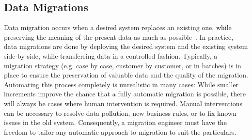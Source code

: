\documentclass[runningheads]{llncs}
\begin{document}
\subsection{Data Migrations}
   Data migration occurs when a desired system replaces an existing one,
   while preserving the meaning of the present data as much as possible~\cite{Spivak2012}.
   In practice, data migrations are done by deploying the desired system and the existing system side-by-side,
   while transferring data in a controlled fashion.
   Typically, a migration strategy (e.g. case by case, customer by customer, or in batches) is in place
   to ensure the preservation of valuable data and the quality of the migration.
   Automating this process completely is unrealistic in many cases:
   While smaller increments improve the chance that a fully automatic migration is possible, there will always be cases where human intervention is required.
   Manual interventions can be necessary to resolve data pollution, new business rules, or to fix known issues in the old system.
   Consequently, a migration engineer must have the freedom to tailor any automatic approach to migration to suit the particulars.
   
\end{document}
